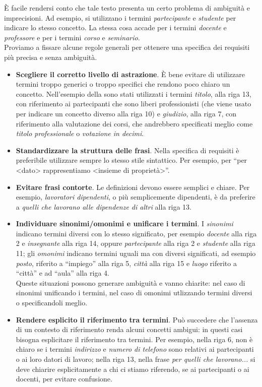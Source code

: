\documentclass[12pt]{report}
\newcommand{\namerefl}[1]{%
	\bgroup
	\let\nmu\MakeLowercase
	\nameref{#1}\egroup}
\newcommand{\nmu}{}
\begin{document}
 	È facile rendersi conto che tale testo presenta un certo problema di ambiguità e imprecisioni. Ad esempio, si utilizzano i termini \textit{partecipante} e \textit{studente} per indicare lo stesso concetto. La stessa cosa accade per i termini \textit{docente} e \textit{professore} e per i termini \textit{corso} e \textit{seminario}. \\
 	Proviamo a fissare alcune regole generali per ottenere una specifica dei requisiti più precisa e senza ambiguità.
 	\begin{itemize}
 		\item \textbf{Scegliere il corretto livello di astrazione}. È bene evitare di utilizzare termini troppo generici o troppo specifici che rendono poco chiaro un concetto. Nell'esempio della \namerefl{exa:societa_formazione} sono stati utilizzati i termini \textit{titolo}, alla riga 13, con riferimento ai partecipanti che sono liberi professionisti (che viene usato per indicare un concetto diverso alla riga 10) e \textit{giudizio}, alla riga 7, con riferimento alla valutazione dei corsi, che andrebbero specificati meglio come \textit{titolo professionale} o \textit{votazione in decimi}.
 		\item \textbf{Standardizzare la struttura delle frasi}. Nella specifica di requisiti è preferibile utilizzare sempre lo stesso stile sintattico. Per esempio, per ``per <dato> rappresentiamo <insieme di proprietà>''.
 		\item \textbf{Evitare frasi contorte}. Le definizioni devono essere semplici e chiare. Per esempio, \textit{lavoratori dipendenti}, o più semplicemente dipendenti, è da preferire a \textit{quelli che lavorano alle dipendenze di altri} alla riga 13.
 		\item \textbf{Individuare sinonimi/omonimi e unificare i termini}. I \textit{sinonimi} indicano termini diversi con lo stesso significato, per esempio \textit{docente} alla riga 2 e \textit{insegnante} alla riga 14, oppure \textit{partecipante} alla riga 2 e \textit{studente} alla riga 11; gli \textit{omonimi} indicano termini uguali ma con diversi significati, ad esempio \textit{posto}, riferito a ``impiego'' alla riga 5, \textit{città} alla riga 15 e \textit{luogo} riferito a ``città'' e ad ``aula'' alla riga 4. \\
 		Queste situazioni possono generare ambiguità e vanno chiarite: nel caso di sinonimi unificando i termini, nel caso di omonimi utlizzando termini diversi o specificandoli meglio.
 		\item \textbf{Rendere esplicito il riferimento tra termini}. Può succedere che l'assenza di un contesto di riferimento renda alcuni concetti ambigui: in questi casi bisogna esplicitare il riferimento tra termini. Per esempio, nella riga 6, non è chiaro se i termini \textit{indirizzo} e \textit{numero di telefono} sono relativi ai partecipanti o ai loro datori di lavoro; nella riga 13, nella frase \textit{per quelli che lavorano...} si deve chiarire esplicitamente a chi ci stiamo riferendo, se ai partecipanti o ai docenti, per evitare confusione.

\end{itemize}
\end{document}
